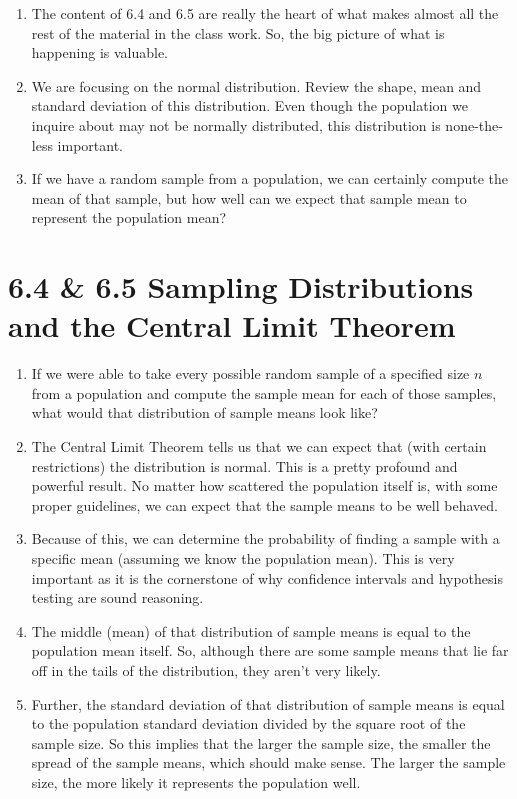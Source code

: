 \documentclass{article}
\begin{document}
\begin{enumerate}

\item The content of 6.4 and 6.5 are really the heart of what makes almost all the rest of the material in the class work. So, the big picture of what is happening is valuable. 

\item We are focusing on the normal distribution. Review the shape, mean and standard deviation of this distribution. Even though the population we inquire about may not be normally distributed, this distribution is none-the-less important.

\item If we have a random sample from a population, we can certainly compute the mean of that sample, but how well can we expect that sample mean to represent the population mean? 

\end{enumerate}

\section*{6.4 \& 6.5 Sampling Distributions and the Central Limit Theorem}

\begin{enumerate}

\item If we were able to take every possible random sample of a specified size $n$ from a population and compute the sample mean for each of those samples, what would that distribution of sample means look like?

\item The Central Limit Theorem tells us that we can expect that (with certain restrictions) the distribution is normal. This is a pretty profound and powerful result. No matter how scattered the population itself is, with some proper guidelines, we can expect that the sample means to be well behaved.

\item Because of this, we can determine the probability of finding a sample with a specific mean (assuming we know the population mean). This is very important as it is the cornerstone of why confidence intervals and hypothesis testing are sound reasoning.

\item The middle (mean) of that distribution of sample means is equal to the population mean itself. So, although there are some sample means that lie far off in the tails of the distribution, they aren't very likely.

\item Further, the standard deviation of that distribution of sample means is equal to the population standard deviation divided by the square root of the sample size. So this implies that the larger the sample size, the smaller the spread of the sample means, which should make sense. The larger the sample size, the more likely it represents the population well.

\end{enumerate}
\end{document}
